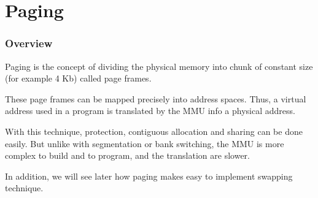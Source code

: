 %
%

\section{Paging}


\begin{frame}
  \frametitle{Overview}

  Paging is the concept of dividing the physical memory into chunk of
  constant size (for example 4 Kb) called page frames.

  \-

  These page frames can be mapped precisely into address spaces. Thus,
  a virtual address used in a program is translated by the MMU info a
  physical address.

  \-

  With this technique, protection, contiguous allocation and sharing
  can be done easily. But unlike with segmentation or bank switching,
  the MMU is more complex to build and to program, and the translation
  are slower.

  \-

  In addition, we will see later how paging makes easy to implement
  swapping technique.

\end{frame}


